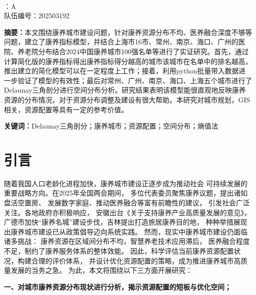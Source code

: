 \documentclass[12pt,a4paper]{article}
\begin{document}
\thispagestyle{empty}
\begin{center}
     \\
    \vspace{1em}
    ：A \\
    \quad 队伍编号：202503192 \\
\end{center}

\vspace{2em}

\noindent\textbf{摘要：}本文围绕康养城市建设问题，针对康养资源分布不均、医养融合深度不够等问题，建立了康养指标模型，并结合上海市16市、常州、南京、海口、广州的医院、养老院分布结合2024中国康养城市100强名单等进行了实证研究。首先，通过计算简化版的康养指标得出康养指标得分越高的城市该城市在名单中的排名越高，推出建立的简化模型可以在一定程度上工作；接着，利用python批量带入数据进一步验证了模型的有效性；最后对常州、广州、南京、海口、上海五个城市进行了Delaunay三角剖分进行空间分布分析。研究结果表明该模型能很直观地反映康养资源的分布情况，对于资源分布调整及建设有很大帮助。本研究对城市规划，GIS相关，资源配置等具有一定的参考价值。

\vspace{1em}

\noindent\textbf{关键词：}Delaunay三角剖分；康养城市；资源配置；空间分布；熵值法

\newpage

\setcounter{page}{1}
\twocolumn[]

\section{引言}

随着我国人口老龄化进程加快，康养城市建设正逐步成为推动社会
可持续发展的重要战略方向。在2025年全国两会期间，
多位代表委员聚焦康养议题，提出诸如盘活空置房、
发展数字家庭、推动医养融合等富有前瞻性的建议，
引发社会广泛关注。各地政府亦积极响应，
安徽出台《关于支持康养产业高质量发展的意见》\cite{01}，
广德市加快“康养名城”建设步伐，吉林提出打造旅居康养目的地，
种种举措展现出康养城市建设已从政策倡导迈向系统实践。
然而，现实中康养城市建设仍面临诸多挑战：
康养资源在区域间分布不均，智慧养老技术应用滞后，
医养融合程度不足，制约了康养服务体系的整体效能。
因此，科学评估当前康养资源配置状况，构建合理的评价体系，
并设计优化资源配置的策略，成为推进康养城市高质量发展的当务之急。
为此，本文将围绕以下三方面开展研究：

\textbf{一、对城市康养资源分布现状进行分析，揭示资源配置的短板与优化空间；}
\end{document}
